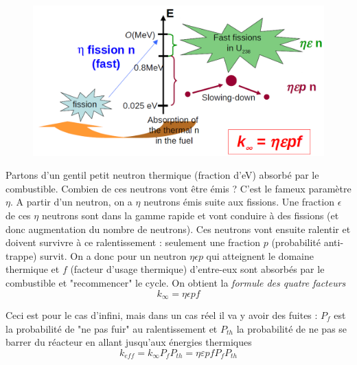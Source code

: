 	\begin{figure}
	\vspace{-5mm}
	\includegraphics[scale=0.27]{ch1/image7.png}
	\end{figure}
Partons d'un gentil petit neutron thermique (fraction d'eV) absorbé par le combustible. Combien 
de ces neutrons vont être émis ? C'est le fameux paramètre $\eta$. A partir d'un neutron, on a 
$\eta$ neutrons émis suite aux fissions. Une fraction $\epsilon$ de ces $\eta$ neutrons sont dans 
la gamme rapide et vont conduire à des fissions (et donc augmentation du nombre de neutrons). Ces
neutrons vont ensuite ralentir et doivent survivre à ce ralentissement : seulement une fraction 
$p$ (probabilité anti-trappe) survit. On a donc pour un neutron $\eta\epsilon p$ qui atteignent 
le domaine thermique et $f$ (facteur d'usage thermique) d'entre-eux sont absorbés par le combustible et "recommencer" le cycle. 
On obtient la \textit{formule des quatre facteurs}
\begin{equation}
k_\infty = \eta\epsilon  pf
\end{equation}

Ceci est pour le cas d'infini, mais dans un cas réel il va y avoir des fuites : $P_f$ est la 
probabilité de "ne pas fuir" au ralentissement et $P_{th}$ la probabilité de ne pas se barrer 
du réacteur en allant jusqu'aux énergies thermiques 
\begin{equation}
k_{eff} = k_\infty P_fP_{th} = \eta \varepsilon pfP_fP_{th}
\end{equation}

